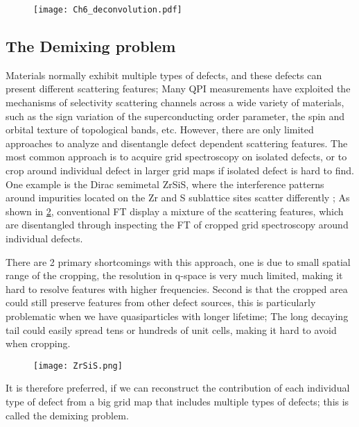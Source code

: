 \begin{figure}
	\texttt{[image: Ch6\_deconvolution.pdf]} 
	\centering
	\caption{}
	\label{fig:ch6_decon}
\end{figure}

\subsection{The Demixing problem}
Materials normally exhibit multiple types of defects, and these defects can present different scattering features; Many QPI measurements have exploited the mechanisms of selectivity scattering channels across a wide variety of materials, such as the sign variation of the superconducting order parameter, the spin and orbital texture of topological bands, etc. However, there are only limited approaches to analyze and disentangle defect dependent scattering features. The most common approach is to acquire grid spectroscopy on isolated defects, or to crop around individual defect in larger grid maps if isolated defect is hard to find. One example is the Dirac semimetal ZrSiS, where the interference patterns around impurities located on the Zr and S sublattice sites scatter differently \cite{butler et al}; As shown in \ref{fig:ch6_ZrSiS}, conventional \ac{FT} display a mixture of the scattering features, which are disentangled through inspecting the \ac{FT} of cropped grid spectroscopy around individual defects. 

There are 2 primary shortcomings with this approach, one is due to small spatial range of the cropping, the resolution in q-space is very much limited, making it hard to resolve features with higher frequencies. Second is that the cropped area could still preserve features from other defect sources, this is particularly problematic when we have quasiparticles with longer lifetime; The long decaying tail could easily spread tens or hundreds of unit cells, making it hard to avoid when cropping. 

\begin{figure}
	\texttt{[image: ZrSiS.png]} 
	\centering
	\caption{}
	\label{fig:ch6_ZrSiS}
\end{figure}

It is therefore preferred, if we can reconstruct the contribution of each individual type of defect from a big grid map that includes multiple types of defects; this is called the demixing problem.  

